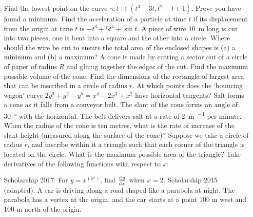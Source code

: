 \begin{questions}
  \questioE Find the lowest point on the curve $ \gamma : t \mapsto (t^3 - 3t, t^2 + t + 1) $. Prove you have found a minimum.
  \questioM Find the acceleration of a particle at time $ t $ if its displacement from the origin at time $ t $ is $ -t^6 + 5t^4 + \sin t $.
  \questioE A piece of wire \SI{10}{\metre} long is cut into two pieces; one is bent into a square and the other into a circle. Where
            should the wire be cut to ensure the total area of the enclosed shapes is (a) a minimum and (b) a maximum?
  \questioM A cone is made by cutting a sector out of a circle of paper of radius $ R $ and gluing together the edges of the cut. Find
            the maximum possible volume of the cone.
  \questioE Find the dimensions of the rectangle of largest area that can be inscribed in a circle of radius $ r $.
  \questioE At which points does the `bouncing wagon' curve $ 2y^3 + y^2 - y^5 = x^4 - 2x^3 + x^2 $ have horizontal tangents?
  \questioE Salt forms a cone as it falls from a conveyor belt. The slant of the cone forms an angle of \SI{30}{\degree} with
            the horizontal. The belt delivers salt at a rate of \SI{2}{\metre\per\cubed} per minute. When the radius of the cone
            is ten metres, what is the rate of increase of the slant height (measured along the surface of the cone)?
  \questioS Suppose we take a circle of radius $ r $, and inscribe within it a triangle such that each corner of the triangle is
            located on the circle. What is the maximum possible area of the triangle?
  \questioE Take derivatives of the following functions with respect to $ x $:
  \questioS Scholarship 2017: For $ y = x^{\left(x^x\right)} $, find $ \od{y}{x} $ when $ x = 2 $.
  \questioS Scholarship 2015 (adapted): A car is driving along a road shaped like a parabola at night. The parabola has a vertex at the origin,
            and the car starts at a point 100 m west and 100 m north of the origin.
    \begin{parts}

\end{parts}
\end{questions}
